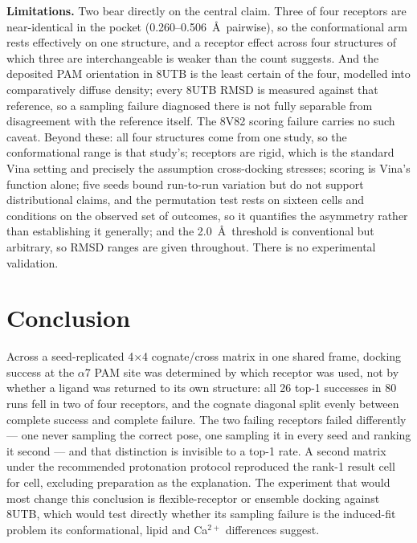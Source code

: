\documentclass[sigconf]{acmart}
\begin{document}
\textbf{Limitations.} Two bear directly on the central claim. Three of four
receptors are near-identical in the pocket (0.260--0.506~\AA\ pairwise), so the
conformational arm rests effectively on one structure, and a receptor effect
across four structures of which three are interchangeable is weaker than the count
suggests. And the deposited PAM orientation in 8UTB is the least certain of the
four, modelled into comparatively diffuse density; every 8UTB RMSD is measured
against that reference, so a sampling failure diagnosed there is not fully
separable from disagreement with the reference itself. The 8V82 scoring failure
carries no such caveat. Beyond these: all four structures come from one study, so
the conformational range is that study's; receptors are rigid, which is the
standard Vina setting and precisely the assumption cross-docking stresses; scoring
is Vina's function alone; five seeds bound run-to-run variation but do not support
distributional claims, and the permutation test rests on sixteen cells and
conditions on the observed set of outcomes, so it quantifies the asymmetry rather
than establishing it generally; and the 2.0~\AA\ threshold is conventional but arbitrary,
so RMSD ranges are given throughout. There is no experimental validation.

\section{Conclusion}

Across a seed-replicated 4$\times$4 cognate/cross matrix in one shared frame,
docking success at the $\alpha$7 PAM site was determined by which receptor was
used, not by whether a ligand was returned to its own structure: all 26 top-1
successes in 80 runs fell in two of four receptors, and the cognate diagonal split
evenly between complete success and complete failure. The two failing receptors
failed differently --- one never sampling the correct pose, one sampling it in
every seed and ranking it second --- and that distinction is invisible to a top-1
rate. A second matrix under the recommended protonation protocol reproduced the
rank-1 result cell for cell, excluding preparation as the explanation. The
experiment that would most change this conclusion is flexible-receptor or ensemble
docking against 8UTB, which would test directly whether its sampling failure is
the induced-fit problem its conformational, lipid and Ca$^{2+}$ differences
suggest.
\end{document}
